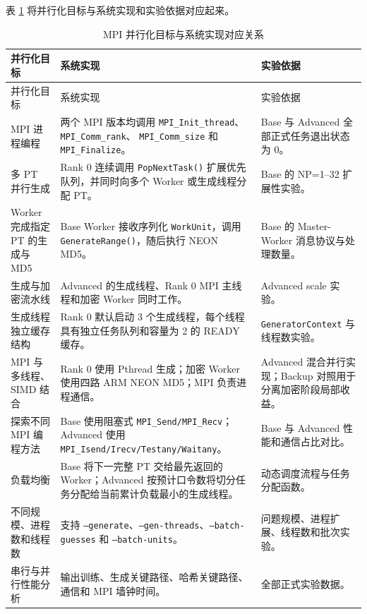\documentclass[UTF8,a4paper,12pt]{ctexart}
\newcommand{\code}[1]{\texttt{#1}}
\begin{document}
表 \ref{tab:requirement-map} 将并行化目标与系统实现和实验依据对应起来。

\begin{longtable}{p{}p{}p{}}
  \caption{MPI 并行化目标与系统实现对应关系}
  \label{tab:requirement-map}\\
  \toprule
  并行化目标 & 系统实现 & 实验依据 \\
  \midrule
  \endfirsthead
  \toprule
  并行化目标 & 系统实现 & 实验依据 \\
  \midrule
  \endhead
  MPI 进程编程 &
  两个 MPI 版本均调用 \code{MPI\_Init\_thread}、\code{MPI\_Comm\_rank}、
  \code{MPI\_Comm\_size} 和 \code{MPI\_Finalize}。 &
  Base 与 Advanced 全部正式任务退出状态为 0。 \\
  多 PT 并行生成 &
  Rank 0 连续调用 \code{PopNextTask()} 扩展优先队列，并同时向多个 Worker 或生成线程分配 PT。 &
  Base 的 NP=1--32 扩展性实验。 \\
  Worker 完成指定 PT 的生成与 MD5 &
  Base Worker 接收序列化 \code{WorkUnit}，调用 \code{GenerateRange()}，随后执行 NEON MD5。 &
  Base 的 Master-Worker 消息协议与处理数量。 \\
  生成与加密流水线 &
  Advanced 的生成线程、Rank 0 MPI 主线程和加密 Worker 同时工作。 &
  Advanced scale 实验。 \\
  生成线程独立缓存结构 &
  Rank 0 默认启动 3 个生成线程，每个线程具有独立任务队列和容量为 2 的 READY 缓存。 &
  \code{GeneratorContext} 与线程数实验。 \\
  MPI 与多线程、SIMD 结合 &
  Rank 0 使用 Pthread 生成；加密 Worker 使用四路 ARM NEON MD5；MPI 负责进程通信。 &
  Advanced 混合并行实现；Backup 对照用于分离加密阶段局部收益。 \\
  探索不同 MPI 编程方法 &
  Base 使用阻塞式 \code{MPI\_Send/MPI\_Recv}；Advanced 使用
  \code{MPI\_Isend/Irecv/Testany/Waitany}。 &
  Base 与 Advanced 性能和通信占比对比。 \\
  负载均衡 &
  Base 将下一完整 PT 交给最先返回的 Worker；Advanced 按预计口令数将切分任务分配给当前累计负载最小的生成线程。 &
  动态调度流程与任务分配函数。 \\
  不同规模、进程数和线程数 &
  支持 \code{--generate}、\code{--gen-threads}、\code{--batch-guesses} 和
  \code{--batch-units}。 &
  问题规模、进程扩展、线程数和批次实验。 \\
  串行与并行性能分析 &
  输出训练、生成关键路径、哈希关键路径、通信和 MPI 墙钟时间。 &
  全部正式实验数据。 \\
  \bottomrule
\end{longtable}
\end{document}
